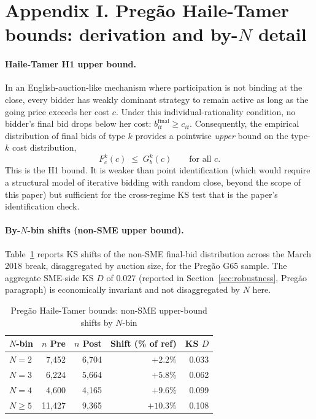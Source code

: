 \documentclass[12pt]{article}
\begin{document}
\section*{Appendix I. Preg\~ao Haile-Tamer bounds: derivation and
by-$N$ detail}
\label{app:ht-pregao}

\paragraph{Haile-Tamer H1 upper bound.}
In an English-auction-like mechanism where participation is
not binding at the close, every bidder has weakly dominant
strategy to remain active as long as the going price exceeds her
cost $c$. Under this individual-rationality condition,
no bidder's final bid drops below her cost: $b^{\text{final}}_{it}
\geq c_{it}$. Consequently, the empirical distribution of final
bids of type $k$ provides a pointwise \emph{upper} bound on the
type-$k$ cost distribution,
\[
F_c^k(c) \;\leq\; G_b^k(c) \qquad \text{for all } c.
\]
This is the \citet{haile2003} H1 bound. It is weaker than point
identification (which would require a structural model of
iterative bidding with random close, beyond the scope of this
paper) but sufficient for the cross-regime KS test that is the
paper's identification check.

\paragraph{By-$N$-bin shifts (non-SME upper bound).}
Table~\ref{tab:ht-byN} reports KS shifts of the non-SME final-bid
distribution across the March 2018 break, disaggregated by
auction size, for the Preg\~ao G65 sample. The aggregate
SME-side KS $D$ of $0.027$ (reported in Section~\ref{sec:robustness},
Preg\~ao paragraph) is economically invariant and not
disaggregated by $N$ here.

\begin{table}[htbp]
\centering
\caption{Preg\~ao Haile-Tamer bounds: non-SME upper-bound shifts by $N$-bin}
\label{tab:ht-byN}
\small
\begin{tabular}{lrrrr}
\toprule
$N$-bin & $n$ Pre & $n$ Post & Shift (\% of ref) & KS $D$ \\
\midrule
$N = 2$   & 7{,}452  & 6{,}704 & $+2.2\%$ & 0.033 \\
$N = 3$   & 6{,}224  & 5{,}664 & $+5.8\%$ & 0.062 \\
$N = 4$   & 4{,}600  & 4{,}165 & $+9.6\%$ & 0.099 \\
$N \geq 5$& 11{,}427 & 9{,}365 & $+10.3\%$ & 0.108 \\
\bottomrule
\end{tabular}
\end{table}
\end{document}
